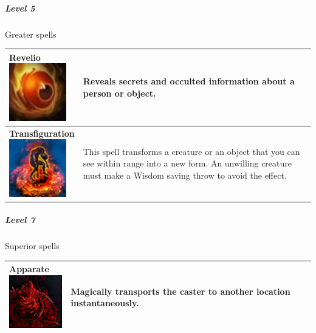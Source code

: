 \subparagraph{Level 5}                                                                                                                        
Greater spells \\                                                                                                                             
\begin{tabular}{ p{3cm}p{14cm} } \hline
	\specialcell[p]{\textbf{Revelio}         \\ \includegraphics[width=2.5cm]{../Pictures/Gameplay/Spells/Icon/Revelio_spell_icon.jpg}}         & Reveals secrets and occulted information about a person or object. \\ \hline   
	\specialcell[p]{\textbf{Transfiguration}         \\ \includegraphics[width=2.5cm]{../Pictures/Gameplay/Spells/Icon/Transfiguration_spell_icon.png}}         & This spell transforms a creature or an object that you can see within range into a new form. An unwilling creature must make a Wisdom saving throw to avoid the effect. \\ \hline                                                                                                  
\end{tabular}                                                                                                                                 

\subparagraph{Level 7}                                                                                                                        
Superior spells \\                                                                                                                            
\begin{tabular}{ p{3cm}p{14cm} } \hline
	\specialcell[p]{\textbf{Apparate}         \\ \includegraphics[width=2.5cm]{../Pictures/Gameplay/Spells/Icon/Apparate_spell_icon.png}}         & Magically transports the caster to another location instantaneously. \\ \hline                                                                                                  
\end{tabular}

